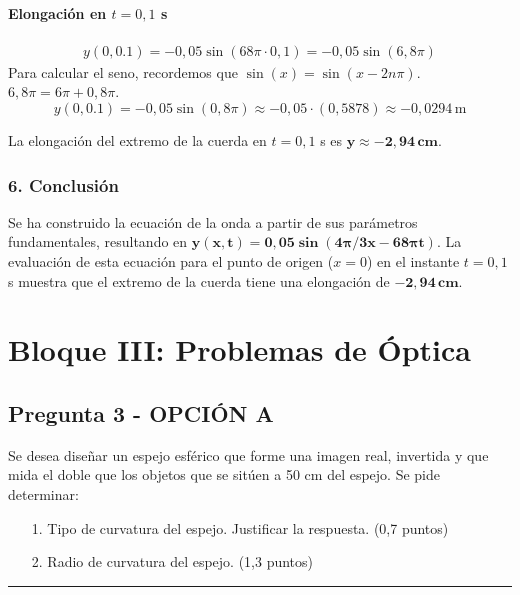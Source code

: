 \paragraph*{Elongación en $t=0,1$ s}
\begin{gather}
    y(0, 0.1) = -0,05 \sin(68\pi \cdot 0,1) = -0,05 \sin(6,8\pi)
\end{gather}
Para calcular el seno, recordemos que $\sin(x) = \sin(x - 2n\pi)$. $6,8\pi = 6\pi + 0,8\pi$.
$$y(0, 0.1) = -0,05 \sin(0,8\pi) \approx -0,05 \cdot (0,5878) \approx -0,0294 \, \text{m}$$
\begin{cajaresultado}
    La elongación del extremo de la cuerda en $t=0,1$ s es $\boldsymbol{y \approx -2,94 \, \textbf{cm}}$.
\end{cajaresultado}

\subsubsection*{6. Conclusión}
\begin{cajaconclusion}
Se ha construido la ecuación de la onda a partir de sus parámetros fundamentales, resultando en $\mathbf{y(x,t) = 0,05 \sin(4\pi/3 x - 68\pi t)}$. La evaluación de esta ecuación para el punto de origen ($x=0$) en el instante $t=0,1$ s muestra que el extremo de la cuerda tiene una elongación de $\mathbf{-2,94 \, cm}$.
\end{cajaconclusion}

\newpage

\section{Bloque III: Problemas de Óptica}
\label{sec:optica_2002_sep_ext}

\subsection{Pregunta 3 - OPCIÓN A}
\label{subsec:3A_2002_sep_ext}

\begin{cajaenunciado}
Se desea diseñar un espejo esférico que forme una imagen real, invertida y que mida el doble que los objetos que se sitúen a 50 cm del espejo. Se pide determinar:
\begin{enumerate}
    \item[1.] Tipo de curvatura del espejo. Justificar la respuesta. (0,7 puntos)
    \item[2.] Radio de curvatura del espejo. (1,3 puntos)
\end{enumerate}
\end{cajaenunciado}
\hrule

